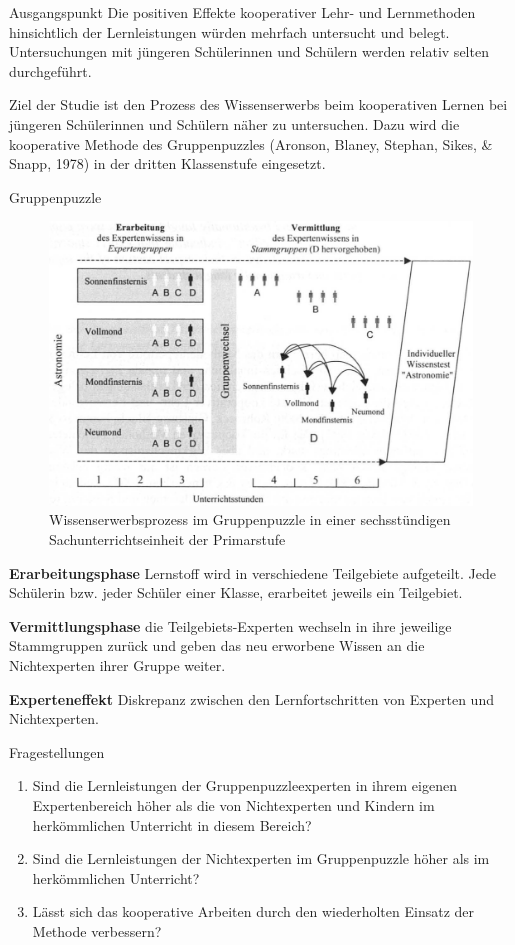 \begin{block}{Ausgangspunkt}
Die positiven Effekte kooperativer Lehr- und Lernmethoden hinsichtlich der Lernleistungen würden mehrfach untersucht und belegt. Untersuchungen mit jüngeren Schülerinnen und Schülern werden relativ selten durchgeführt.

Ziel der Studie ist den Prozess des Wissenserwerbs beim kooperativen Lernen bei jüngeren Schülerinnen und Schülern näher zu untersuchen. Dazu wird die kooperative Methode des Gruppenpuzzles (Aronson, Blaney, Stephan, Sikes, \& Snapp, 1978) in der dritten Klassenstufe eingesetzt.
\end{block}

\begin{block}{Gruppenpuzzle} 
\begin{figure}
\includegraphics[width=0.67\linewidth]{experteneffekt.jpg}
\caption{Wissenserwerbsprozess im Gruppenpuzzle in einer sechsstündigen Sachunterrichtseinheit der Primarstufe}
\end{figure}

\textbf{Erarbeitungsphase} Lernstoff wird in verschiedene Teilgebiete aufgeteilt. Jede Schülerin bzw. jeder Schüler einer Klasse, erarbeitet jeweils ein Teilgebiet.

\textbf{Vermittlungsphase} die Teilgebiets-Experten wechseln in ihre jeweilige Stammgruppen zurück und geben das neu erworbene Wissen an die Nichtexperten ihrer Gruppe weiter. 

\textbf{Experteneffekt} Diskrepanz zwischen den Lernfortschritten von Experten und Nichtexperten.  
\end{block}

\begin{alertblock}{Fragestellungen}
\begin{enumerate}
\item Sind die Lernleistungen der Gruppenpuzzleexperten in ihrem eigenen Expertenbereich höher als die von Nichtexperten und Kindern im herkömmlichen Unterricht in diesem Bereich?
\item Sind die Lernleistungen der Nichtexperten im Gruppenpuzzle höher als im herkömmlichen Unterricht?
\item Lässt sich das kooperative Arbeiten durch den wiederholten Einsatz der Methode verbessern?
\end{enumerate}
\end{alertblock}
